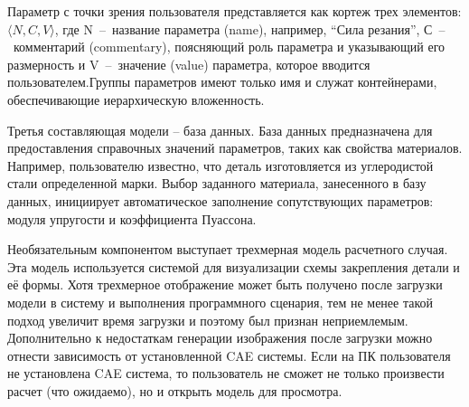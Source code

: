 \documentclass[14pt,oneside,final]{extreport}
\begin{document}
	Параметр с точки зрения пользователя представляется как кортеж трех элементов: $ \langle N,C,V \rangle $, где N~--~название параметра (name), например, ``Сила резания'', С~--~комментарий (commentary), поясняющий роль параметра и указывающий его размерность и V~--~значение (value) параметра, которое вводится пользователем.Группы параметров имеют только имя и служат контейнерами, обеспечивающие иерархическую вложенность.  
	
	Третья составляющая модели -- база данных. База данных предназначена для предоставления справочных значений параметров, таких как свойства материалов. Например, пользователю известно, что деталь изготовляется из углеродистой стали определенной марки. Выбор заданного материала, занесенного в базу данных, инициирует автоматическое заполнение сопутствующих параметров: модуля упругости и коэффициента Пуассона. 
	
	Необязательным компонентом выступает трехмерная модель расчетного случая. Эта модель используется системой  для визуализации схемы закрепления детали и её формы. Хотя трехмерное отображение может быть получено после загрузки модели в систему и выполнения программного сценария, тем не менее такой подход увеличит время загрузки и поэтому был признан неприемлемым. Дополнительно к недостаткам генерации изображения после загрузки можно отнести зависимость от установленной CAE системы. Если на ПК пользователя не установлена CAE система, то пользователь не сможет не только произвести расчет (что ожидаемо), но и открыть модель для просмотра.    
\end{document}
